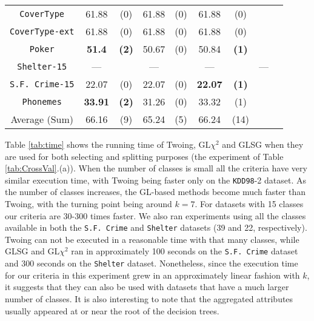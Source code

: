 \begin{table}
\begin{tabular}{c|cc|cc|cc|cc}
{\tt CoverType}     &61.88      &  (0)             &   61.88      & (0)             &  61.88      &  (0)           & &      \\
{\tt CoverType-ext} &61.88      &  (0)             &   61.88      & (0)             &  61.88      &  (0)           & &      \\
 {\tt Poker}         &{\bf 51.4} &  {\bf (2)}       &   50.67      & (0)             &  50.84      &  {\bf (1)}     & &      \\
 {\tt Shelter-15}    &---        &                  &   ---        &                 &   ---       &                & ---  &      \\
 {\tt S.F. Crime-15} &22.07      &  (0)             &  22.07       & (0)             & {\bf 22.07} &  {\bf (1)}     & &      \\
 {\tt Phonemes}      & {\bf 33.91}&  {\bf (2)}       & 31.26        &  (0)            &  33.32      &  (1)           & &       \\  \hline
 Average (Sum)       & 66.16      &  (9)             & 65.24        & (5)             &  66.24      & (14)
       \end{tabular}
\normalsize
\label{tab:CrossVal-b}
\end{table}


Table \ref{tab:time} shows the running time of Twoing, GL$\chi^2$ and GLSG  when
they are used for both selecting and splitting purposes (the experiment of Table \ref{tab:CrossVal}.(a)).
When the number of classes is small all the criteria have very similar execution time, with Twoing being faster only on the {\tt KDD98}-2 dataset. As the number of classes increases, the GL-based methods become much faster than Twoing, with the turning point being around $k=7$. For datasets with 15 classes our criteria are 30-300 times faster. We also ran experiments using all the classes available in both the {\tt S.F. Crime} and {\tt Shelter} datasets (39 and 22, respectively). Twoing can not be executed in a reasonable time with that many classes, while GLSG and GL$\chi^2$ ran in approximately 100 seconds on the {\tt S.F. Crime} dataset and  300 seconds on the {\tt Shelter} dataset. Nonetheless, since the execution time for our criteria in this experiment grew in an approximately linear fashion with $k$, it suggests that they can also be used with datasets that have a much larger number of classes. It is also interesting to note that the aggregated attributes usually appeared at or near the root of the decision trees.


